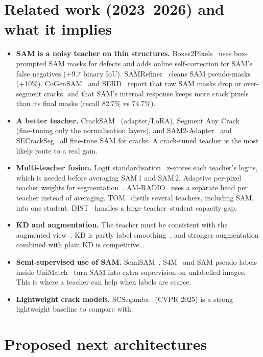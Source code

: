 \documentclass[11pt,a4paper]{article}
\begin{document}
\section{Related work (2023--2026) and what it implies}
\begin{itemize}
\item \textbf{SAM is a noisy teacher on thin structures.} Boxes2Pixels~\cite{b2p} uses box-prompted SAM masks for defects and adds online
self-correction for SAM's false negatives (+9.7 binary IoU). SAMRefiner~\cite{samrefiner} cleans SAM pseudo-masks (+10\%).
CoGenSAM~\cite{cogen} and SERD~\cite{serd} report that raw SAM masks drop or over-segment cracks, and that SAM's internal
response keeps more crack pixels than its final masks (recall 82.7\% vs 74.7\%).
\item \textbf{A better teacher.} CrackSAM~\cite{cracksam} (adapter/LoRA), Segment Any Crack~\cite{sac} (fine-tuning only the normalisation layers), and
SAM2-Adapter~\cite{sam2ad} and SECrackSeg~\cite{secrack} all fine-tune SAM for cracks. A crack-tuned teacher is the most likely route to a real gain.
\item \textbf{Multi-teacher fusion.} Logit standardisation~\cite{logitstd} z-scores each teacher's logits, which is needed before averaging SAM\,1 and SAM\,2.
Adaptive per-pixel teacher weights for segmentation~\cite{adamt}. AM-RADIO~\cite{radio} uses a separate head per teacher instead of averaging.
TOM~\cite{tom} distils several teachers, including SAM, into one student. DIST~\cite{dist} handles a large teacher--student capacity gap.
\item \textbf{KD and augmentation.} The teacher must be consistent with the augmented view~\cite{beyer}. KD is partly
label smoothing~\cite{yuan,sultan}, and stronger augmentation combined with plain KD is competitive~\cite{augkd}.
\item \textbf{Semi-supervised use of SAM.} SemiSAM~\cite{semisam}, S4M~\cite{s4m} and SAM pseudo-labels inside UniMatch~\cite{unimatch} turn SAM into extra supervision on unlabelled images.
This is where a teacher can help when labels are scarce.
\item \textbf{Lightweight crack models.} SCSegamba~\cite{scseg} (CVPR 2025) is a strong lightweight baseline to compare with.
\end{itemize}

\section{Proposed next architectures}
\end{document}
